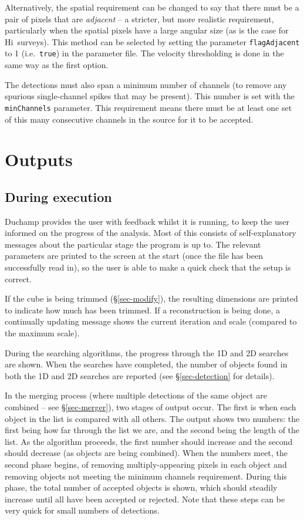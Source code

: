 \documentclass[12pt]{article}
\newcommand{\ie}{i.e.\ }
\newcommand{\hi}{H{\sc i}}
\begin{document}
Alternatively, the spatial requirement can be changed to say that
there must be a pair of pixels that are {\it adjacent} -- a stricter,
but more realistic requirement, particularly when the spatial pixels
have a large angular size (as is the case for \hi\ surveys). This
method can be selected by setting the parameter
{\tt flagAdjacent} to 1 (\ie {\tt true}) in the parameter file. The
velocity thresholding is done in the same way as the first option.

The detections must also span a minimum number of channels (to remove
any spurious single-channel spikes that may be present). This number
is set with the {\tt minChannels} parameter. This requirement means
there must be at least one set of this many consecutive channels in
the source for it to be accepted. 

\section{Outputs}
\label{sec-output}

\subsection{During execution}

Duchamp provides the user with feedback whilst it is running, to
keep the user informed on the progress of the analysis. Most of this
consists of self-explanatory messages about the particular stage the
program is up to. The relevant parameters are printed to the screen at
the start (once the file has been successfully read in), so the user
is able to make a quick check that the setup is correct.

If the cube is being trimmed (\S\ref{sec-modify}), the resulting
dimensions are printed to indicate how much has been trimmed. If a
reconstruction is being done, a continually updating message shows the
current iteration and scale (compared to the maximum scale). 

During the searching algorithms, the progress through the 1D and 2D
searches are shown. When the searches have completed,
the number of objects found in both the 1D and 2D searches are
reported (see \S\ref{sec-detection} for details).

In the merging process (where multiple detections of the same object
are combined -- see \S\ref{sec-merger}), two stages of output
occur. The first is when each object in the list is compared with all
others. The output shows two numbers: the first being how far through
the list we are, and the second being the length of the list. As the
algorithm proceeds, the first number should increase and the second
should decrease (as objects are being combined). When the numbers
meet, the second phase begins, of removing multiply-appearing pixels
in each object and removing objects not meeting the minimum channels
requirement. During this phase, the total number of accepted objects
is shown, which should steadily increase until all have been accepted
or rejected. Note that these steps can be very quick for small numbers
of detections.
\end{document}
